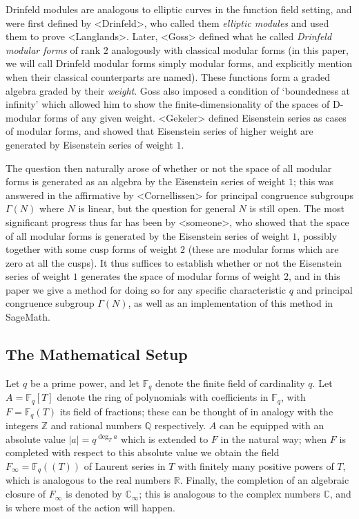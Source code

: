 \documentclass[11pt]{article}
\newcommand*{\ZZ}{\mathbb{Z}}
\newcommand*{\QQ}{\mathbb{Q}}
\newcommand*{\RR}{\mathbb{R}}
\newcommand*{\CC}{\mathbb{C}}
\newcommand*{\CCi}{\mathbb{C}_\infty}
\newcommand*{\FF}{\mathbb{F}}
\newcommand*{\abs}[1]{\left\lvert#1\right\rvert}
\begin{document}
Drinfeld modules are analogous to elliptic curves in the function field setting, and were first defined by <Drinfeld>, who called them \emph{elliptic modules} and used them to prove <Langlands>.
Later, <Goss> defined what he called \emph{Drinfeld modular forms} of rank $2$ analogously with classical modular forms (in this paper, we will call Drinfeld modular forms simply modular forms, and explicitly mention when their classical counterparts are named).
These functions form a graded algebra graded by their \emph{weight}.
Goss also imposed a condition of `boundedness at infinity' which allowed him to show the finite-dimensionality of the spaces of D-modular forms of any given weight.
<Gekeler> defined Eisenstein series as cases of modular forms, and showed that Eisenstein series of higher weight are generated by Eisenstein series of weight $1$.

The question then naturally arose of whether or not the space of all modular forms is generated as an algebra by the Eisenstein series of weight $1$; this was answered in the affirmative by <Cornellissen> for principal congruence subgroups $\Gamma(N)$ where $N$ is linear, but the question for general $N$ is still open.
The most significant progress thus far has been by <someone>, who showed that the space of all modular forms is generated by the Eisenstein series of weight $1$, possibly together with some cusp forms of weight $2$ (these are modular forms which are zero at all the cusps).
It thus suffices to establish whether or not the Eisenstein series of weight $1$ generates the space of modular forms of weight $2$, and in this paper we give a method for doing so for any specific characteristic $q$ and principal congruence subgroup $\Gamma(N)$, as well as an implementation of this method in SageMath.


\subsection{The Mathematical Setup} \label{ssec:msetup}
Let $q$ be a prime power, and let $\FF_q$ denote the finite field of cardinality $q$.
Let $A = \FF_q[T]$ denote the ring of polynomials with coefficients in $\FF_q$, with $F = \FF_q(T)$ its field of fractions; these can be thought of in analogy with the integers $\ZZ$ and rational numbers $\QQ$ respectively.
$A$ can be equipped with an absolute value $\abs{a} = q^{\deg_T a}$ which is extended to $F$ in the natural way; when $F$ is completed with respect to this absolute value we obtain the field $F_\infty = \FF_q((T))$ of Laurent series in $T$ with finitely many positive powers of $T$, which is analogous to the real numbers $\RR$.
Finally, the completion of an algebraic closure of $F_\infty$ is denoted by $\CCi$; this is analogous to the complex numbers $\CC$, and is where most of the action will happen.
\end{document}
